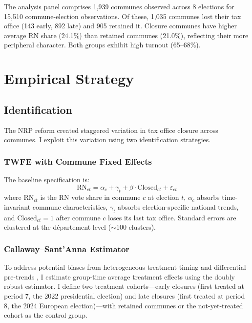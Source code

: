 \documentclass[12pt]{article}
\begin{document}


The analysis panel comprises 1,939 communes observed across 8 elections for 15,510 commune-election observations. Of these, 1,035 communes lost their tax office (143 early, 892 late) and 905 retained it. Closure communes have higher average RN share (24.1\%) than retained communes (21.0\%), reflecting their more peripheral character. Both groups exhibit high turnout (65--68\%).

\section{Empirical Strategy}

\subsection{Identification}

The NRP reform created staggered variation in tax office closure across communes. I exploit this variation using two identification strategies.

\subsubsection*{TWFE with Commune Fixed Effects} The baseline specification is:
\begin{equation}
\text{RN}_{ct} = \alpha_c + \gamma_t + \beta \cdot \text{Closed}_{ct} + \varepsilon_{ct}
\label{eq:twfe}
\end{equation}
where $\text{RN}_{ct}$ is the RN vote share in commune $c$ at election $t$, $\alpha_c$ absorbs time-invariant commune characteristics, $\gamma_t$ absorbs election-specific national trends, and $\text{Closed}_{ct}=1$ after commune $c$ loses its last tax office. Standard errors are clustered at the d\'{e}partement level ($\sim$100 clusters).

\subsubsection*{Callaway--Sant'Anna Estimator} To address potential biases from heterogeneous treatment timing and differential pre-trends \citep{callaway2021difference}, I estimate group-time average treatment effects using the doubly robust estimator. I define two treatment cohorts---early closures (first treated at period 7, the 2022 presidential election) and late closures (first treated at period 8, the 2024 European election)---with retained communes or the not-yet-treated cohort as the control group.
\end{document}
